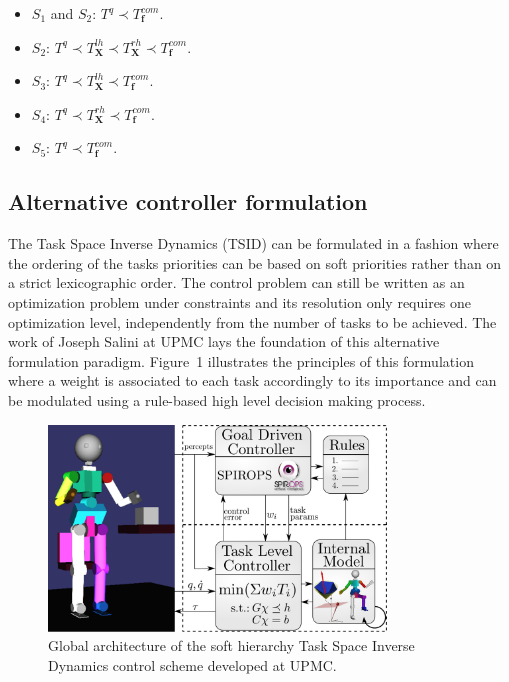 \documentclass[12pt,a4paper,twoside]{article}
\begin{document}
\begin{itemize}
\item $S_1$ and $S_2$: $T^q \prec T^{com}_{\bm f}$.
\item $S_2$: $T^q \prec T^{lh}_{\bm X}  \prec  T^{rh}_{\bm X} \prec T^{com}_{\bm f} $.
\item $S_3$: $T^q \prec T^{lh}_{\bm X}  \prec T^{com}_{\bm f} $.
\item $S_4$: $T^q \prec T^{rh}_{\bm X}  \prec T^{com}_{\bm f} $.
\item $S_5$: $T^q \prec T^{com}_{\bm f} $.
\end{itemize}

\subsection{Alternative controller formulation}
The Task Space Inverse Dynamics (TSID) can be formulated in a fashion where the ordering of the tasks priorities can be based on soft priorities rather than on a strict lexicographic order. The control problem can still be written as an optimization problem under constraints and its resolution only requires one optimization level, independently from the number of tasks to be achieved. The work of Joseph Salini \cite{salini2012} at UPMC lays the foundation of this alternative formulation paradigm. Figure~1 illustrates the principles of this formulation where a weight is associated to each task accordingly to its importance and can be modulated using a rule-based high level decision making process.\\

\begin{figure}[h]
\begin{center}
\centering
\includegraphics[width=0.8\textwidth]{images/global_architecture.pdf} 

\caption{Global architecture of the soft hierarchy Task Space Inverse Dynamics control scheme developed at UPMC.}
\end{center}
\label{fig:joseph}
\end{figure}
\end{document}
